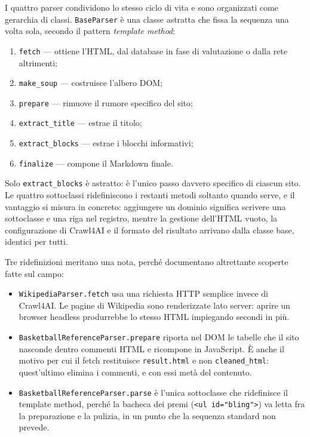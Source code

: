 \documentclass[10pt,a4paper,twocolumn]{article}
\begin{document}
I quattro parser condividono lo stesso ciclo di vita e sono organizzati come
gerarchia di classi. \texttt{BaseParser} è una classe astratta che fissa la
sequenza una volta sola, secondo il pattern \emph{template method}:

\begin{enumerate}
  \item \texttt{fetch} --- ottiene l'HTML, dal database in fase di valutazione
        o dalla rete altrimenti;
  \item \texttt{make\_soup} --- costruisce l'albero DOM;
  \item \texttt{prepare} --- rimuove il rumore specifico del sito;
  \item \texttt{extract\_title} --- estrae il titolo;
  \item \texttt{extract\_blocks} --- estrae i blocchi informativi;
  \item \texttt{finalize} --- compone il Markdown finale.
\end{enumerate}

Solo \texttt{extract\_blocks} è astratto: è l'unico passo davvero specifico di
ciascun sito. Le quattro sottoclassi ridefiniscono i restanti metodi soltanto
quando serve, e il vantaggio si misura in concreto: aggiungere un dominio
significa scrivere una sottoclasse e una riga nel registro, mentre la gestione
dell'HTML vuoto, la configurazione di Crawl4AI e il formato del risultato
arrivano dalla classe base, identici per tutti.

Tre ridefinizioni meritano una nota, perché documentano altrettante scoperte
fatte sul campo:

\begin{itemize}
  \item \texttt{WikipediaParser.fetch} usa una richiesta HTTP semplice invece
        di Crawl4AI. Le pagine di Wikipedia sono renderizzate lato server:
        aprire un browser headless produrrebbe lo stesso HTML impiegando
        secondi in più.
  \item \texttt{BasketballReferenceParser.prepare} riporta nel DOM le tabelle
        che il sito nasconde dentro commenti HTML e ricompone in JavaScript.
        È anche il motivo per cui il fetch restituisce \texttt{result.html} e
        non \texttt{cleaned\_html}: quest'ultimo elimina i commenti, e con essi
        metà del contenuto.
  \item \texttt{BasketballReferenceParser.parse} è l'unica sottoclasse che
        ridefinisce il template method, perché la bacheca dei premi
        (\texttt{<ul id="bling">}) va letta fra la preparazione e la pulizia,
        in un punto che la sequenza standard non prevede.
\end{itemize}
\end{document}
